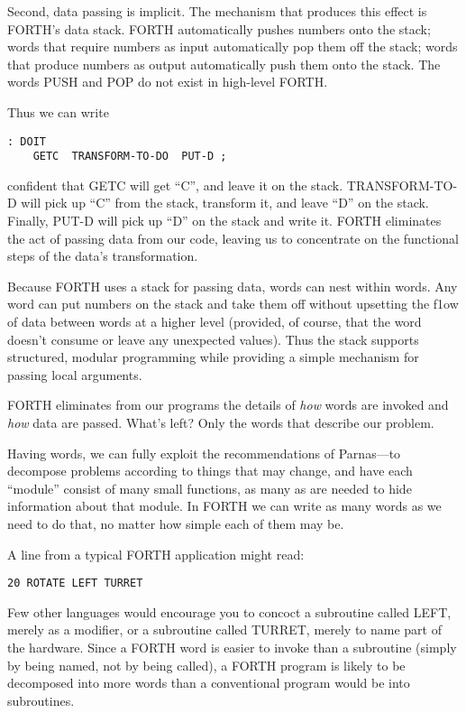 Second, data passing is implicit. The mechanism that produces this
effect is FORTH's data stack. FORTH automatically pushes numbers onto
the stack; words that require numbers as input automatically pop them
off the stack; words that produce numbers as output automatically
push them onto the stack. The words PUSH and POP do not exist in high-level
FORTH.

Thus we can write

\begin{verbatim}
: DOIT
    GETC  TRANSFORM-TO-DO  PUT-D ;
\end{verbatim}
confident that GETC will get {}``C'', and leave it on the stack.
TRANSFORM-TO-D will pick up {}``C'' from the stack, transform it,
and leave {}``D'' on the stack. Finally, PUT-D will pick up {}``D''
on the stack and write it. FORTH eliminates the act of passing data
from our code, leaving us to concentrate on the functional steps of
the data's transformation.

Because FORTH uses a stack for passing data, words can nest within
words. Any word can put numbers on the stack and take them off without
upsetting the f1ow of data between words at a higher level (provided,
of course, that the word doesn't consume or leave any unexpected values).
Thus the stack supports structured, modular programming while providing
a simple mechanism for passing local arguments.

FORTH eliminates from our programs the details of \emph{how} words
are invoked and \emph{how} data are passed. What's left? Only the
words that describe our problem.

Having words, we can fully exploit the recommendations of Parnas---to
decompose problems according to things that may change, and have each
{}``module'' consist of many small functions, as many as are needed
to hide information about that module. In FORTH we can write as many
words as we need to do that, no matter how simple each of them may
be.

A line from a typical FORTH application might read:

\begin{verbatim}
20 ROTATE LEFT TURRET
\end{verbatim}
Few other languages would encourage you to concoct a subroutine called
LEFT, merely as a modifier, or a subroutine called TURRET, merely
to name part of the hardware. Since a FORTH word is easier to invoke
than a subroutine (simply by being named, not by being called), a
FORTH program is likely to be decomposed into more words than a conventional
program would be into subroutines.


